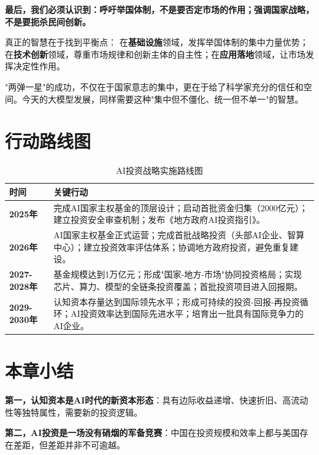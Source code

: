 \textbf{最后，我们必须认识到：呼吁举国体制，不是要否定市场的作用；强调国家战略，不是要扼杀民间创新。}

真正的智慧在于找到平衡点：
在\textbf{基础设施}领域，发挥举国体制的集中力量优势；在\textbf{技术创新}领域，尊重市场规律和创新主体的自主性；在\textbf{应用落地}领域，让市场发挥决定性作用。

"两弹一星"的成功，不仅在于国家意志的集中，更在于给了科学家充分的信任和空间。今天的大模型发展，同样需要这种"集中但不僵化、统一但不单一"的智慧。

\section{行动路线图}

\begin{table}[H]
\centering
\caption{AI投资战略实施路线图}
\small
\begin{tabular}{p{2cm}p{10.5cm}}
\toprule
\textbf{时间} & \textbf{关键行动} \\
\midrule
\textbf{2025年} & 
完成AI国家主权基金的顶层设计；启动首批资金归集（2000亿元）；建立投资安全审查机制；发布《地方政府AI投资指引》。

 \\
\midrule
\textbf{2026年} & 
AI国家主权基金正式运营；完成首批战略投资（头部AI企业、智算中心）；建立投资效率评估体系；协调地方政府投资，避免重复建设。

 \\
\midrule
\textbf{2027-2028年} & 
基金规模达到1万亿元；形成"国家-地方-市场"协同投资格局；实现芯片、算力、模型的全链条投资覆盖；首批投资项目进入回报期。

 \\
\midrule
\textbf{2029-2030年} & 
认知资本存量达到国际领先水平；形成可持续的投资-回报-再投资循环；AI投资效率达到国际先进水平；培育出一批具有国际竞争力的AI企业。

 \\
\bottomrule
\end{tabular}
\end{table}

\section{本章小结}
\textbf{第一，认知资本是AI时代的新资本形态}：具有边际收益递增、快速折旧、高流动性等独特属性，需要新的投资逻辑。

\textbf{第二，AI投资是一场没有硝烟的军备竞赛}：中国在投资规模和效率上都与美国存在差距，但差距并非不可逾越。

